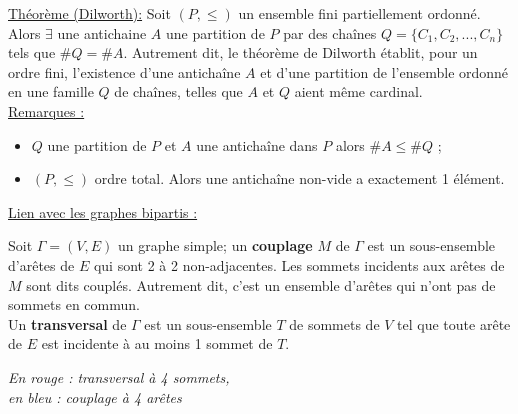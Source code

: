 \documentclass[11pt]{article}
\begin{document}
		\underline{Théorème (Dilworth):} Soit $(P,\leq)$ un ensemble fini partiellement ordonné. Alors $\exists$ une antichaine $A$ une partition de $P$ par des chaînes $Q=\{C_1,C_2,...,C_n\}$ tels que $\#Q=\#A$. Autrement dit, le théorème de Dilworth établit, pour un ordre fini, l'existence d'une antichaîne $A$ et d'une partition de l'ensemble ordonné en une famille $Q$ de chaînes, telles que $A$ et $Q$ aient même cardinal.\\
		
		\underline{Remarques :}
		\begin{itemize}
			\item $Q$ une partition de $P$ et $A$ une antichaîne dans $P$ alors $\#A \leq \#Q$ ;
			\item $(P,\leq)$ ordre total. Alors une antichaîne non-vide a exactement 1 élément.
		\end{itemize}

		\underline{Lien avec les graphes bipartis :}
		
		Soit $\Gamma=(V,E)$ un graphe simple; un \textbf{couplage} $M$ de $\Gamma$ est un sous-ensemble d'arêtes de $E$ qui sont 2 à 2 non-adjacentes. Les sommets incidents aux arêtes de $M$ sont dits couplés. Autrement dit, c'est un ensemble d'arêtes qui n'ont pas de sommets en commun.\\
		
		Un \textbf{transversal} de $\Gamma$ est un sous-ensemble $T$ de sommets de $V$ tel que toute arête de $E$ est incidente à au moins 1 sommet de $T$.\\
			
		\begin{minipage}{0.5\textwidth}
					\centering
						\end{minipage}\hfill
						\begin{minipage}{0.5\textwidth}
						\centering
				\textit{En rouge : transversal à 4 sommets,\\
						en bleu : couplage à 4 arêtes}
				\end{minipage}\\
\end{document}
